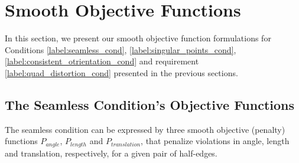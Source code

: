 \section{Smooth Objective Functions}
In this section, we present our smooth objective function formulations for Conditions \ref{label:seamless_cond}, \ref{label:singular_points_cond}, \ref{label:consistent_otrientation_cond} and requirement \ref{label:quad_distortion_cond} presented in the previous sections.
\subsection{The Seamless Condition's Objective Functions}
The seamless condition can be expressed by three smooth objective (penalty) functions $P_{angle}$, $P_{length}$ and $P_{translation}$, that penalize violations in angle, length and translation, respectively, for a given pair of half-edges.
